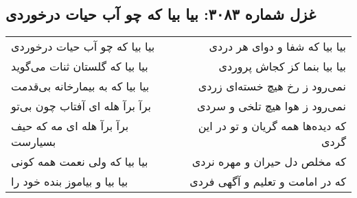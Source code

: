 \begin{center}
\section*{غزل شماره ۳۰۸۳: بیا بیا که چو آب حیات درخوردی}
\label{sec:3083}
\begin{longtable}{l p{0.5cm} r}
بیا بیا که چو آب حیات درخوردی
&&
بیا بیا که شفا و دوای هر دردی
\\
بیا بیا که گلستان ثنات می‌گوید
&&
بیا بیا بنما کز کجاش پروردی
\\
بیا بیا که به بیمارخانه بی‌قدمت
&&
نمی‌رود ز رخ هیچ خسته‌ای زردی
\\
برآ برآ هله ای آفتاب چون بی‌تو
&&
نمی‌رود ز هوا هیچ تلخی و سردی
\\
برآ برآ هله ای مه که حیف بسیارست
&&
که دیده‌ها همه گریان و تو در این گردی
\\
بیا بیا که ولی نعمت همه کونی
&&
که مخلص دل حیران و مهره نردی
\\
بیا بیا و بیاموز بنده خود را
&&
که در امامت و تعلیم و آگهی فردی
\\
\end{longtable}
\end{center}
